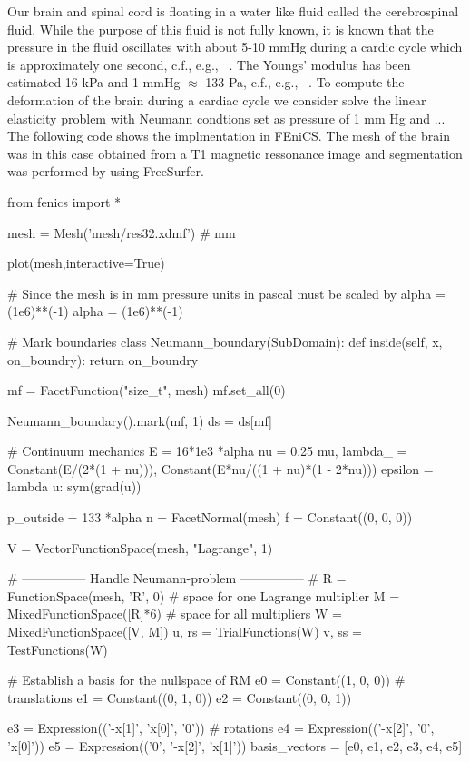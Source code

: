 \begin{example}
Our brain and spinal cord is floating in a water like fluid called the cerebrospinal fluid.
While the purpose of this fluid is not fully known, it is known that the pressure in
the fluid oscillates with about 5-10 mmHg during a cardic cycle which is approximately one
second, c.f., e.g., ~\cite{eide2016correlation}. The Youngs' modulus has been estimated 16 kPa
and 1 mmHg $\approx$ 133 Pa, c.f., e.g., ~\cite{stoverud2016poro}. To compute the deformation of the brain during a
cardiac cycle we consider solve the linear elasticity problem with Neumann condtions
set as pressure of 1 mm Hg and ... The following code shows the implmentation in FEniCS.
The mesh of the brain was in this case obtained from a T1 magnetic ressonance image
and segmentation was performed by using FreeSurfer. 

\begin{python}
from fenics import *

mesh = Mesh('mesh/res32.xdmf')	# mm

plot(mesh,interactive=True)

# Since the mesh is in mm pressure units in pascal must be scaled by alpha = (1e6)**(-1)
alpha = (1e6)**(-1)

# Mark boundaries
class Neumann_boundary(SubDomain):
	def inside(self, x, on_boundry):
		return on_boundry

mf = FacetFunction("size_t", mesh)
mf.set_all(0)

Neumann_boundary().mark(mf, 1)
ds = ds[mf]

# Continuum mechanics
E = 16*1e3 *alpha
nu = 0.25
mu, lambda_ = Constant(E/(2*(1 + nu))), Constant(E*nu/((1 + nu)*(1 - 2*nu)))
epsilon = lambda u: sym(grad(u))

p_outside = 133 *alpha
n = FacetNormal(mesh)
f = Constant((0, 0, 0))

V = VectorFunctionSpace(mesh, "Lagrange", 1)

# --------------- Handle Neumann-problem --------------- #
R = FunctionSpace(mesh, 'R', 0)        		 # space for one Lagrange multiplier
M = MixedFunctionSpace([R]*6)          		 # space for all multipliers
W = MixedFunctionSpace([V, M])
u, rs = TrialFunctions(W)
v, ss = TestFunctions(W)

# Establish a basis for the nullspace of RM
e0 = Constant((1, 0, 0))				# translations
e1 = Constant((0, 1, 0))
e2 = Constant((0, 0, 1))

e3 = Expression(('-x[1]', 'x[0]', '0')) # rotations
e4 = Expression(('-x[2]', '0', 'x[0]'))
e5 = Expression(('0', '-x[2]', 'x[1]'))
basis_vectors = [e0, e1, e2, e3, e4, e5]


\end{python}
\end{example}
